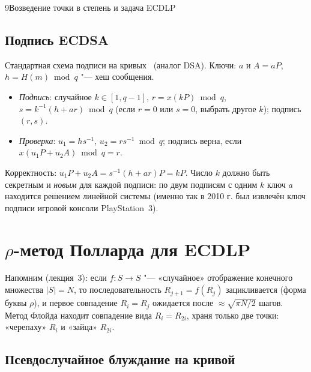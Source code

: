 \begin{lecture}{9}{Возведение точки в степень и задача ECDLP}
\subsection{Подпись ECDSA}

Стандартная схема подписи на кривых~\cite{ecdsa} (аналог DSA). Ключи: $a$ и $A = aP$,
$h = H(m) \bmod q$ "--- хеш сообщения.
\begin{itemize}
  \item \emph{Подпись}: случайное $k \in [1, q - 1]$, $r = x(kP) \bmod q$,
    $s = k^{-1}(h + ar) \bmod q$ (если $r = 0$ или $s = 0$, выбрать другое $k$); подпись $(r, s)$.
  \item \emph{Проверка}: $u_1 = h s^{-1}$, $u_2 = r s^{-1} \bmod q$; подпись верна, если
    $x(u_1 P + u_2 A) \bmod q = r$.
\end{itemize}
Корректность: $u_1 P + u_2 A = s^{-1}(h + ar) P = kP$. Число $k$ должно быть секретным и
\emph{новым} для каждой подписи: по двум подписям с одним $k$ ключ $a$ находится решением
линейной системы (именно так в 2010 г. был извлечён ключ подписи игровой консоли PlayStation~3).


\section{\texorpdfstring{$\rho$}{rho}-метод Полларда для ECDLP}\label{l9:rho}

Напомним (лекция~3): если $f\colon S \to S$ "--- «случайное» отображение конечного множества
$|S| = N$, то последовательность $R_{j+1} = f(R_j)$ зацикливается (форма буквы $\rho$), и
первое совпадение $R_i = R_j$ ожидается после $\approx \sqrt{\pi N / 2}$ шагов. Метод Флойда
находит совпадение вида $R_i = R_{2i}$, храня только две точки: «черепаху» $R_i$ и «зайца»
$R_{2i}$.

\subsection{Псевдослучайное блуждание на кривой}


\end{lecture}
